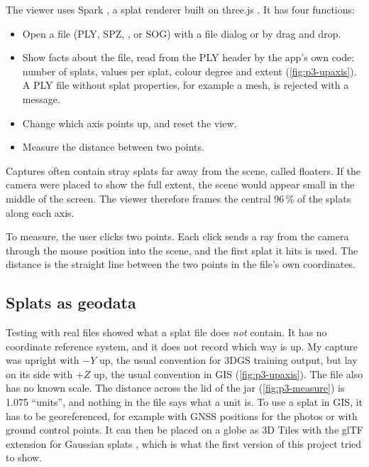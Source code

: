 The viewer uses Spark \citep{spark}, a splat renderer built on three.js \citep{threejs}. It has four functions:
\begin{itemize}
  \item Open a file (PLY, SPZ, ,  or SOG) with a file dialog or by drag and drop.
  \item Show facts about the file, read from the PLY header by the app's own code: number of splats, values per splat, colour degree and extent (\cref{fig:p3-upaxis}). A PLY file without splat properties, for example a mesh, is rejected with a message.
  \item Change which axis points up, and reset the view.
  \item Measure the distance between two points.
\end{itemize}
Captures often contain stray splats far away from the scene, called floaters. If the camera were placed to show the full extent, the scene would appear small in the middle of the screen. The viewer therefore frames the central 96\,\% of the splats along each axis.

To measure, the user clicks two points. Each click sends a ray from the camera through the mouse position into the scene, and the first splat it hits is used. The distance is the straight line between the two points in the file's own coordinates.

\subsection{Splats as geodata}

Testing with real files showed what a splat file does \emph{not} contain. It has no coordinate reference system, and it does not record which way is up. My capture was upright with $-Y$ up, the usual convention for 3DGS training output, but lay on its side with $+Z$ up, the usual convention in GIS (\cref{fig:p3-upaxis}). The file also has no known scale. The distance across the lid of the jar (\cref{fig:p3-measure}) is 1.075 ``units'', and nothing in the file says what a unit is. To use a splat in GIS, it has to be georeferenced, for example with GNSS positions for the photos or with ground control points. It can then be placed on a globe as 3D Tiles with the glTF extension for Gaussian splats \citep{3dtiles,khr-gaussian-splatting}, which is what the first version of this project tried to show.

